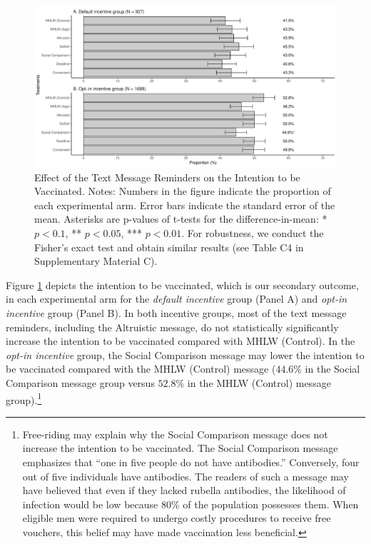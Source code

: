 \documentclass[
  11pt,
  a4paper
]{article}
\begin{document}
\begin{figure}[t]
\includegraphics{Main-Document-LaTeX_files/figure-latex/ttest-int-vacc-1} \caption{Effect of the Text Message Reminders on the Intention to be Vaccinated. Notes: Numbers in the figure indicate the proportion of each experimental arm. Error bars indicate the standard error of the mean. Asterisks are p-values of t-tests for the difference-in-mean: * $p < 0.1$, ** $p < 0.05$, *** $p < 0.01$. For robustness, we conduct the Fisher's exact test and obtain similar results (see Table C4 in Supplementary Material C).}\label{fig:ttest-int-vacc}
\end{figure}

Figure \ref{fig:ttest-int-vacc} depicts the intention to be vaccinated, which is our secondary outcome, in each experimental arm for the \emph{default incentive} group (Panel A) and \emph{opt-in incentive} group (Panel B). In both incentive groups, most of the text message reminders, including the Altruistic message, do not statistically significantly increase the intention to be vaccinated compared with MHLW (Control). In the \emph{opt-in incentive} group, the Social Comparison message may lower the intention to be vaccinated compared with the MHLW (Control) message (\(44.6\)\% in the Social Comparison message group versus \(52.8\)\% in the MHLW (Control) message group).\footnote{Free-riding may explain why the Social Comparison message does not increase the intention to be vaccinated. The Social Comparison message emphasizes that ``one in five people do not have antibodies.'' Conversely, four out of five individuals have antibodies. The readers of such a message may have believed that even if they lacked rubella antibodies, the likelihood of infection would be low because 80\% of the population possesses them. When eligible men were required to undergo costly procedures to receive free vouchers, this belief may have made vaccination less beneficial.}
\end{document}
